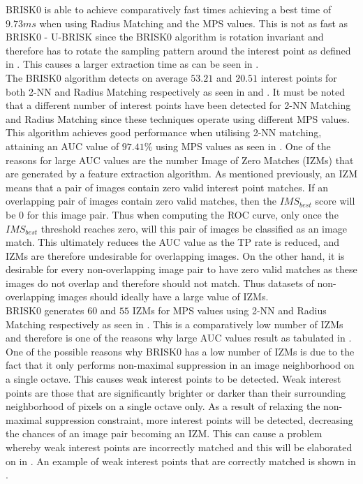 \documentclass[11pt]{report}
\begin{document}
BRISK0 is able to achieve comparatively fast times achieving a best time of $9.73 ms$ when using Radius Matching and the MPS values. This is not as fast as BRISK0 - U-BRISK since the BRISK0 algorithm is rotation invariant and therefore has to rotate the sampling pattern around the interest point as defined in . This causes a larger extraction time as can be seen in .\\

The BRISK0 algorithm detects on average $53.21$ and $20.51$ interest points for both 2-NN and Radius Matching respectively as seen in  and . It must be noted that a different number of interest points have been detected for 2-NN Matching and Radius Matching since these techniques operate using different MPS values. \\

This algorithm achieves good performance when utilising 2-NN matching, attaining an AUC value of $97.41\%$ using MPS values as seen in . One of the reasons for large AUC values are the number Image of Zero Matches (IZMs) that are generated by a feature extraction algorithm. As mentioned previously, an IZM means that a pair of images contain zero valid interest point matches. If an overlapping pair of images contain zero valid matches, then the $IMS_{best}$ score will be $0$ for this image pair. Thus when computing the ROC curve, only once the $IMS_{best}$ threshold reaches zero, will this pair of images be classified as an image match. This ultimately reduces the AUC value as the TP rate is reduced, and IZMs are therefore undesirable for overlapping images. On the other hand, it is desirable for every non-overlapping image pair to have zero valid matches as these images do not overlap and therefore should not match. Thus datasets of non-overlapping images should ideally have a large value of IZMs.\\

BRISK0 generates $60$ and $55$ IZMs for MPS values using 2-NN and Radius Matching respectively as seen in . This is a comparatively low number of IZMs and therefore is one of the reasons why large AUC values result as tabulated in . One of the possible reasons why BRISK0 has a low number of IZMs is due to the fact that it only performs non-maximal suppression in an image neighborhood on a single octave. This causes weak interest points to be detected. Weak interest points are those that are significantly brighter or darker than their surrounding neighborhood of pixels on a single octave only. As a result of relaxing the non-maximal suppression constraint, more interest points will be detected, decreasing the chances of an image pair becoming an IZM. This can cause a problem whereby weak interest points are incorrectly matched and this will be elaborated on in . An example of weak interest points that are correctly matched is shown in .\\
\end{document}
